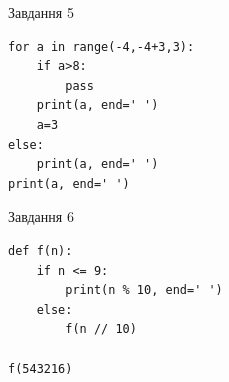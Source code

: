\documentclass[12pt, ukrainian]{article}
\begin{document}
{\vspace{15mm}
\begin{minipage}[t]{9.7cm}                
{\begin{center}Завдання {5}\end{center}}
\begin{verbatim}
for a in range(-4,-4+3,3):
    if a>8:
        pass
    print(a, end=' ')
    a=3
else:
    print(a, end=' ')
print(a, end=' ')
\end{verbatim}     
\end{minipage}
\vline \hspace{8mm}
\begin{minipage}[t]{8.0cm}                
{\begin{center}Завдання {6}\end{center}}
\begin{verbatim}
def f(n):
    if n <= 9:
        print(n % 10, end=' ')
    else:
        f(n // 10)

f(543216)
\end{verbatim}     
\end{minipage}

}
\newpage
\end{document}
